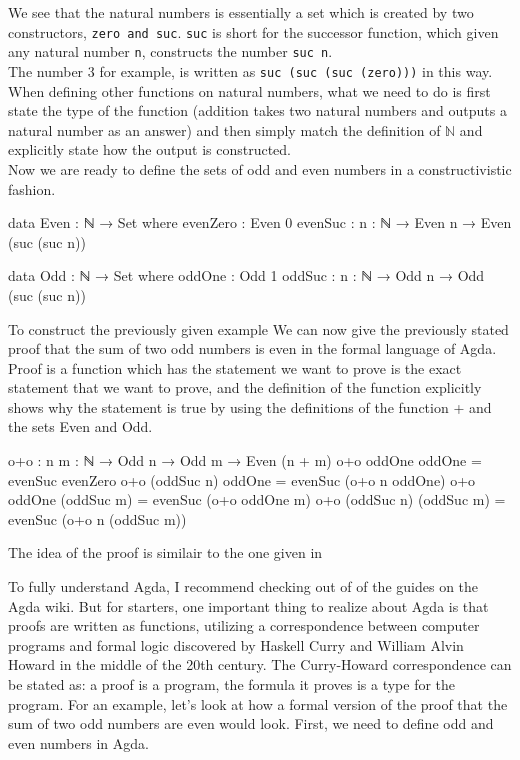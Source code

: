 \documentclass[11pt,a4paper]{article}
\begin{document}
We see that the natural numbers is essentially a set which is created by two constructors, \texttt{zero and suc}. \texttt{suc} is short for the successor function, which given any natural number \texttt{n}, constructs the number \texttt{suc n}. \\
The number 3 for example, is written as \texttt{suc (suc (suc (zero)))} in this way. When defining other functions on natural numbers, what we need to do is first state the type of the function (addition takes two natural numbers and outputs a natural number as an answer) and then simply match the definition of $\mathbb{N}$ and explicitly state how the output is constructed.\\
Now we are ready to define the sets of odd and even numbers in a constructivistic fashion.
\begin{code}
data Even : ℕ → Set where
  evenZero : Even 0
  evenSuc : {n : ℕ} → Even n → Even (suc (suc n))
 
data Odd : ℕ → Set where
  oddOne : Odd 1
  oddSuc : {n : ℕ} → Odd n → Odd (suc (suc n))
\end{code}
To construct the previously given example 
We can now give the previously stated proof that the sum of two odd numbers is even in the formal language of Agda. Proof is a function which has the statement we want to prove is the exact statement that we want to prove, and the definition of the function explicitly shows why the statement is true by using the definitions of the function + and the sets Even and Odd.
\begin{code}
o+o : {n m : ℕ} → Odd n → Odd m → Even (n + m)
o+o oddOne oddOne = evenSuc evenZero
o+o (oddSuc n) oddOne = evenSuc (o+o n oddOne)
o+o oddOne (oddSuc m) = evenSuc (o+o oddOne m)
o+o (oddSuc n) (oddSuc m) = evenSuc (o+o n (oddSuc m))
\end{code}

The idea of the proof is similair to the one given in


To fully understand Agda, I recommend checking out of of the guides on the Agda wiki. But for starters, one important thing to realize about Agda is that proofs are written as functions, utilizing a correspondence between computer programs and formal logic discovered by Haskell Curry and William Alvin Howard in the middle of the 20th century. The Curry-Howard correspondence can be stated as: a proof is a program, the formula it proves is a type for the program. For an example, let's look at how a formal version of the  proof that the sum of two odd numbers are even would look. First, we need to define odd and even numbers in Agda.
\end{document}
